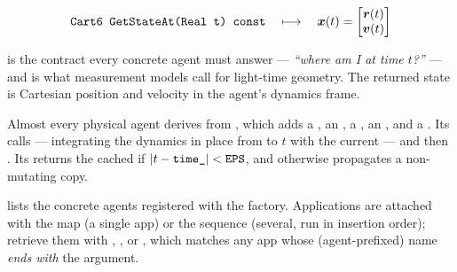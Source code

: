 \begin{equation}
  \label{eq:sim-getstateat}
  \texttt{Cart6 GetStateAt(Real t) const}
  \quad\longmapsto\quad
  \bm{x}(t) = \begin{bmatrix}\bm{r}(t)\\ \bm{v}(t)\end{bmatrix}
\end{equation}

is the contract every concrete agent must answer --- \emph{``where am I at time
$t$?''} --- and is what measurement models call for light-time geometry. The
returned state is Cartesian position and velocity in the agent's dynamics frame.

Almost every physical agent derives from , which adds a
, an , a , an
, and a . Its  calls
 --- integrating the dynamics in place from  to $t$
with the current  --- and then . Its
 returns the cached  if $|t - \texttt{time\_}| <
\texttt{EPS}$, and otherwise propagates a non-mutating copy.

 lists the concrete agents registered with the
factory. Applications are attached with the  map (a single app)
or the  sequence (several, run in insertion order); retrieve
them with , , or
, which matches any app whose (agent-prefixed)
name \emph{ends with} the argument.

